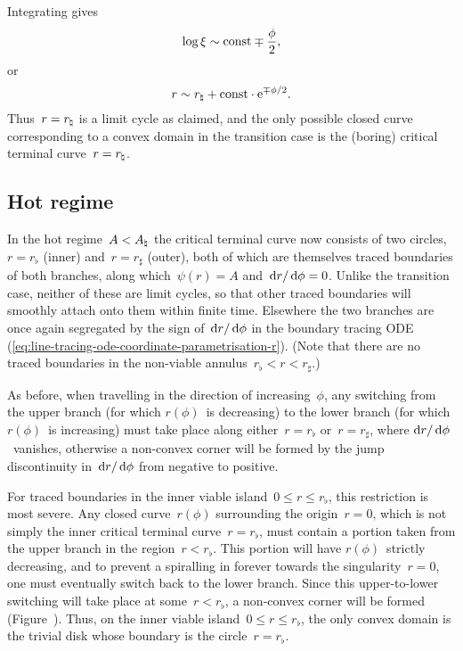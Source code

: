Integrating gives
\begin{equation}
  \log \xi \sim \mathrm{const} \mp \frac{\phi}{2},
  \label{eq:line-traced-boundary-transition-log-xi-near-r-natural}
\end{equation}
or
\begin{equation}
  r \sim r_\natural + \mathrm{const} \cdot \mathrm{e}^{\mp \phi / 2}.
  \label{eq:line-traced-boundary-transition-r-near-r-natural}
\end{equation}
Thus~$r = r_\natural$ is a limit cycle as claimed,
and the only possible closed curve corresponding to a convex domain
in the transition case
is the (boring) critical terminal curve~$r = r_\natural$.

\subsection{Hot regime}
\label{sec:polar.tracing.hot}

In the hot regime~$A < A_\natural$
the critical terminal curve now consists of two circles,
$r = r_\flat$ (inner) and~$r = r_\sharp$ (outer),
both of which are themselves traced boundaries of both branches,
along which~$\psi (r) = A$ and~$\mathop{}\!\mathrm{d} r / \mathop{}\!\mathrm{d}\phi = 0$.
Unlike the transition case,
neither of these are limit cycles,
so that other traced boundaries will smoothly attach onto them
within finite time.
Elsewhere the two branches are once again segregated
by the sign of~$\mathop{}\!\mathrm{d} r / \mathop{}\!\mathrm{d}\phi$ in the boundary tracing ODE~%
  (\ref{eq:line-tracing-ode-coordinate-parametrisation-r}).
(Note that there are no traced boundaries
in the non-viable annulus~$r_\flat < r < r_\sharp$.)

As before, when travelling in the direction of increasing~$\phi$,
any switching from the upper branch (for which $r (\phi)$~is decreasing)
to the lower branch (for which $r (\phi)$~is increasing)
must take place along either~$r = r_\flat$ or~$r = r_\sharp$,
where $\mathop{}\!\mathrm{d} r / \mathop{}\!\mathrm{d}\phi$~vanishes,
otherwise a non-convex corner will be formed
by the jump discontinuity in~$\mathop{}\!\mathrm{d} r / \mathop{}\!\mathrm{d}\phi$
from negative to positive.

For traced boundaries in the inner viable island~$0 \le r \le r_\flat$,
this restriction is most severe.
Any closed curve~$r (\phi)$ surrounding the origin~$r = 0$,
which is not simply the inner critical terminal curve~$r = r_\flat$,
must contain a portion taken from the upper branch
in the region~$r < r_\flat$.
This portion will have $r (\phi)$~strictly decreasing,
and to prevent a spiralling in forever
towards the singularity~$r = 0$,
one must eventually switch back to the lower branch.
Since this upper-to-lower switching will take place at some~$r < r_\flat$,
a non-convex corner will be formed
(Figure~\tbd).
Thus, on the inner viable island~$0 \le r \le r_\flat$,
the only convex domain is the trivial disk
whose boundary is the circle~$r = r_\flat$.

